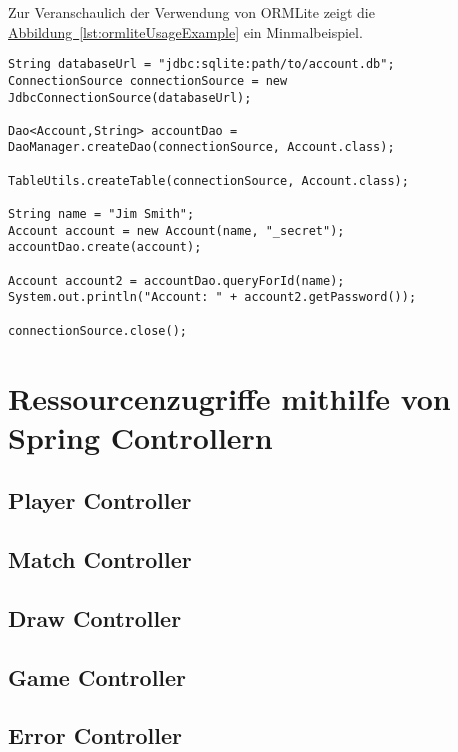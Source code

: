 Zur Veranschaulich der Verwendung von ORMLite zeigt die \hyperref[lst:ormliteUsageExample]{Abbildung~\ref{lst:ormliteUsageExample}} ein Minmalbeispiel.
\begin{lstlisting}[style=lstStyleFramed, caption={[Beispiel: Verwendung von ORMLite\protect\footnote{verändert nach \cite{ormlite}}] Beispiel: Verwendung von ORMLite\protect\footnotemark}, label=lst:ormliteUsageExample]
String databaseUrl = "jdbc:sqlite:path/to/account.db";
ConnectionSource connectionSource = new JdbcConnectionSource(databaseUrl);

Dao<Account,String> accountDao = DaoManager.createDao(connectionSource, Account.class);

TableUtils.createTable(connectionSource, Account.class);

String name = "Jim Smith";
Account account = new Account(name, "_secret");
accountDao.create(account);

Account account2 = accountDao.queryForId(name);
System.out.println("Account: " + account2.getPassword());

connectionSource.close();
\end{lstlisting}

\section{Ressourcenzugriffe mithilfe von Spring Controllern}
\subsection{Player Controller}
\subsection{Match Controller}
\subsection{Draw Controller}
\subsection{Game Controller}
\subsection{Error Controller}